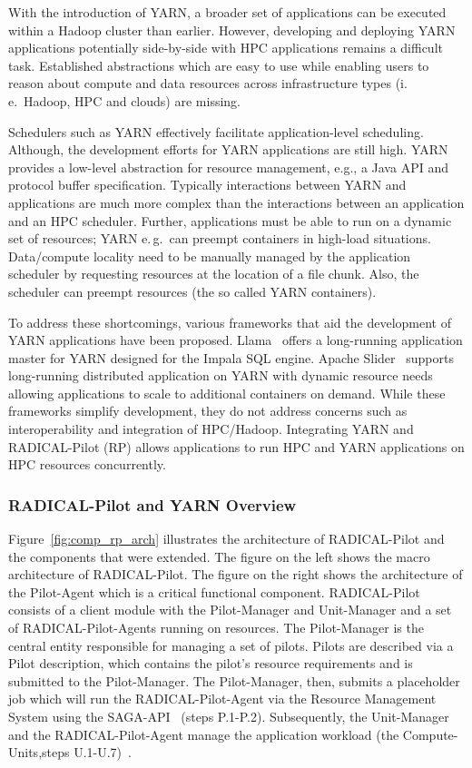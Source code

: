 With the introduction of YARN, a broader set of applications can be executed within a Hadoop cluster than earlier.
However, developing and deploying YARN applications potentially side-by-side with HPC applications remains a difficult task.
Established abstractions which are easy to use while enabling users to reason about compute and data resources across infrastructure types (i.\,e.\ Hadoop, HPC and clouds) are missing. 

Schedulers such as YARN effectively facilitate application-level scheduling.
Although, the development efforts for YARN applications are still high.
YARN provides a low-level abstraction for resource management, e.g., a Java API and protocol buffer specification.
Typically interactions between YARN and applications are much more complex than the interactions between an application and an HPC scheduler.
Further, applications must be able to run on a dynamic set of resources; YARN e.\,g.\ can preempt containers in high-load situations.
Data/compute locality need to be manually managed by the application scheduler by requesting resources at the location of a file chunk.
Also, the scheduler can preempt resources (the so called YARN containers).

To address these shortcomings, various frameworks that aid the development of YARN applications have been proposed.
Llama~\cite{llama} offers a long-running application master for YARN designed for the Impala SQL engine.
Apache Slider~\cite{apache-slider} supports long-running distributed application on YARN with dynamic resource needs allowing applications to scale to additional containers on demand.
While these frameworks simplify development, they do not address concerns such as interoperability and integration of HPC/Hadoop.
Integrating YARN and RADICAL-Pilot (RP) allows applications to run HPC and YARN applications on HPC resources concurrently.

\subsubsection*{RADICAL-Pilot and YARN Overview}
\label{sssec:rp_yarn}
Figure~\ref{fig:comp_rp_arch} illustrates the architecture of RADICAL-Pilot and the components that were extended.
The figure on the left shows the macro architecture of RADICAL-Pilot.
The figure on the right shows the architecture of the Pilot-Agent which is a critical functional component.
RADICAL-Pilot consists of a client module with the Pilot-Manager and Unit-Manager and a set of RADICAL-Pilot-Agents running on resources.
The Pilot-Manager is the central entity responsible for managing a set of pilots.
Pilots are described via a Pilot description, which contains the pilot's resource requirements and is submitted to the Pilot-Manager.
The Pilot-Manager, then, submits a placeholder job which will run the RADICAL-Pilot-Agent via the Resource Management System using the SAGA-API~\cite{merzky2015saga} (steps P.1-P.2).
Subsequently, the Unit-Manager and the RADICAL-Pilot-Agent manage the application workload (the Compute-Units,steps U.1-U.7)~\cite{merzky2019using}.

